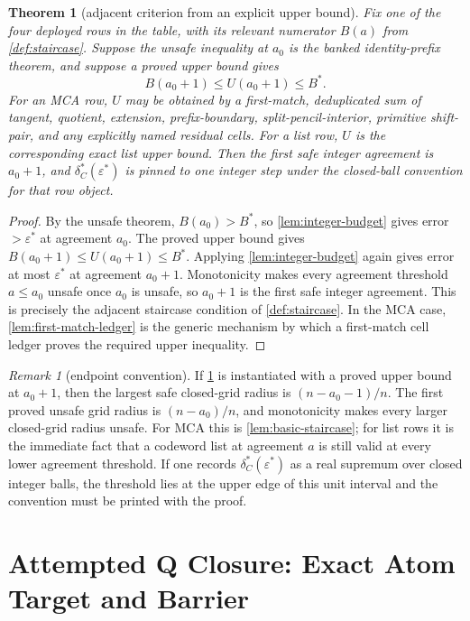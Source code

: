 \documentclass[a4paper,11pt]{amsart}
\newtheorem{theorem}{Theorem}[section]
\theoremstyle{remark}
\newtheorem{remark}[remark]{Remark}
\begin{document}
\begin{theorem}[adjacent criterion from an explicit upper bound]\label{thm:finite}
Fix one of the four deployed rows in the table, with its relevant numerator \(B(a)\) from \cref{def:staircase}.  Suppose the unsafe inequality at \(a_0\) is the banked identity-prefix theorem, and suppose a proved upper bound gives
\[
        B(a_0+1)\le U(a_0+1)\le B^* .
\]
For an MCA row, \(U\) may be obtained by a first-match, deduplicated sum of tangent, quotient, extension, prefix-boundary, split-pencil-interior, primitive shift-pair, and any explicitly named residual cells.  For a list row, \(U\) is the corresponding exact list upper bound.  Then the first safe integer agreement is \(a_0+1\), and \(\delta_C^*(\varepsilon^*)\) is pinned to one integer step under the closed-ball convention for that row object.
\end{theorem}

\begin{proof}
By the unsafe theorem, \(B(a_0)>B^*\), so \cref{lem:integer-budget} gives error \(>\varepsilon^*\) at agreement \(a_0\).  The proved upper bound gives \(B(a_0+1)\le U(a_0+1)\le B^*\).  Applying \cref{lem:integer-budget} again gives error at most \(\varepsilon^*\) at agreement \(a_0+1\).  Monotonicity makes every agreement threshold \(a\le a_0\) unsafe once \(a_0\) is unsafe, so \(a_0+1\) is the first safe integer agreement.  This is precisely the adjacent staircase condition of \cref{def:staircase}.  In the MCA case, \cref{lem:first-match-ledger} is the generic mechanism by which a first-match cell ledger proves the required upper inequality.
\end{proof}

\begin{remark}[endpoint convention]\label{rem:endpoint}
If \cref{thm:finite} is instantiated with a proved upper bound at \(a_0+1\), then the largest safe closed-grid radius is \((n-a_0-1)/n\).  The first proved unsafe grid radius is \((n-a_0)/n\), and monotonicity makes every larger closed-grid radius unsafe.  For MCA this is \cref{lem:basic-staircase}; for list rows it is the immediate fact that a codeword list at agreement \(a\) is still valid at every lower agreement threshold.  If one records \(\delta_C^*(\varepsilon^*)\) as a real supremum over closed integer balls, the threshold lies at the upper edge of this unit interval and the convention must be printed with the proof.
\end{remark}


\section{Attempted Q Closure: Exact Atom Target and Barrier}
\end{document}
